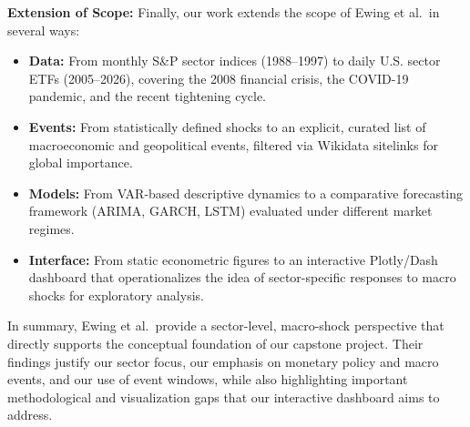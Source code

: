 \documentclass{article}
\begin{document}
\vspace{0.5em}

\noindent \textbf{Extension of Scope:}  
Finally, our work extends the scope of Ewing et al.\ in several ways:

\begin{itemize}
    \item \textbf{Data:} From monthly S\&P sector indices (1988–1997) to daily U.S. sector ETFs (2005–2026), covering the 2008 financial crisis, the COVID-19 pandemic, and the recent tightening cycle.
    \item \textbf{Events:} From statistically defined shocks to an explicit, curated list of macroeconomic and geopolitical events, filtered via Wikidata sitelinks for global importance.
    \item \textbf{Models:} From VAR-based descriptive dynamics to a comparative forecasting framework (ARIMA, GARCH, LSTM) evaluated under different market regimes.
    \item \textbf{Interface:} From static econometric figures to an interactive Plotly/Dash dashboard that operationalizes the idea of sector-specific responses to macro shocks for exploratory analysis.
\end{itemize}

\noindent In summary, Ewing et al.\ provide a sector-level, macro-shock perspective that directly supports the conceptual foundation of our capstone project. Their findings justify our sector focus, our emphasis on monetary policy and macro events, and our use of event windows, while also highlighting important methodological and visualization gaps that our interactive dashboard aims to address.
\end{document}
